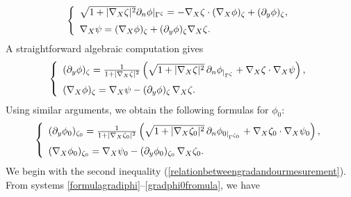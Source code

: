 \documentclass[11pt]{article}
\begin{document}
\begin{equation*}
	\left\{
	\begin{array}{ll}
		\vspace{0.2cm}
		\sqrt{1+|\nabla_X\zeta|^2}\partial_n\phi|_{\Gamma^{\zeta}}=-\nabla_X\zeta \cdot (\nabla_X\phi)_{\zeta}+(\partial_y\phi )_{\zeta},\\
		\nabla_X\psi=(\nabla_X\phi)_{\zeta}+(\partial_y\phi)_{\zeta}\nabla_X\zeta.
	\end{array}
	\right.
\end{equation*}
A straightforward algebraic computation gives
\begin{equation}\label{formulagradiphi}
	\left\{
	\begin{array}{ll}
		\vspace{0.2cm}
		(\partial_y\phi )_{\zeta} =\frac{1}{1+|\nabla_X\zeta|^2}\left(\sqrt{1+|\nabla_X\zeta|^2}\,\partial_n\phi_{|_{\Gamma^{\zeta}}}+\nabla_X\zeta\cdot\nabla_X\psi\right),\\
		(\nabla_X\phi )_{\zeta}=\nabla_X \psi-(\partial_y\phi)_{\zeta}\,\nabla_X\zeta.
	\end{array}
	\right.
\end{equation}
Using similar arguments, we obtain the following formulas for $\phi_0$:
\begin{equation}\label{gradphi0fromula}
	\left\{
	\begin{array}{ll}
		\vspace{0.2cm}
		(\partial_y\phi_0 )_{\zeta_0} =\frac{1}{1+|\nabla_X\zeta_0|^2}\left(\sqrt{1+|\nabla_X\zeta_0|^2}\,\partial_n\phi_{0|_{\Gamma^{\zeta_0}}}+\nabla_X\zeta_0\cdot\nabla_X\psi_0\right),\\
		(\nabla_X\phi_0 )_{\zeta_0}=\nabla_X \psi_0-(\partial_y\phi_0)_{\zeta_0}\,\nabla_X\zeta_0.
	\end{array}
	\right.
\end{equation}
We begin with the second inequality (\ref{relationbetweengradandourmesurement}). From systems \eqref{formulagradiphi}–\eqref{gradphi0fromula}, we have
\end{document}
